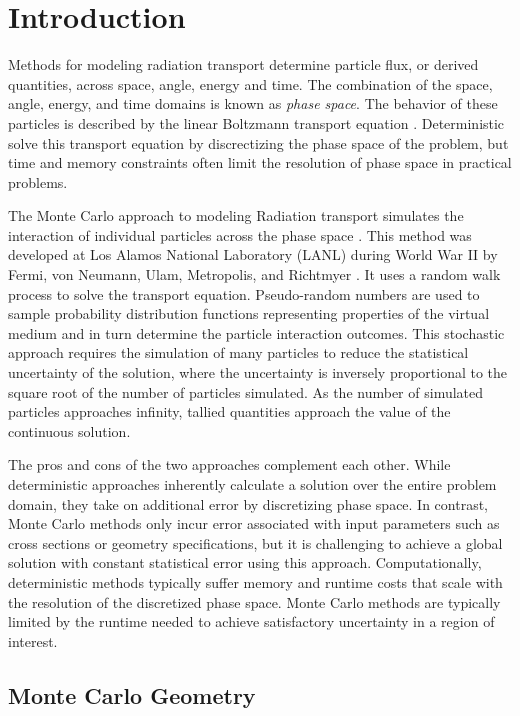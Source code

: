
\chapter{Introduction}\label{ch:introduction}

Methods for modeling radiation transport determine particle flux, or derived
quantities, across space, angle, energy and time. The combination of the space,
angle, energy, and time domains is known as \textit{phase space}. The behavior
of these particles is described by the linear Boltzmann transport
equation \cite{Ulam_1949}. Deterministic solve this transport equation by discrectizing
the phase space of the problem, but time and memory constraints often limit the
resolution of phase space in practical problems.

The Monte Carlo approach to modeling Radiation transport simulates the
interaction of individual particles across the phase
space \cite{Lewis_1993}. This method was developed at Los Alamos National
Laboratory (LANL) during World War II by Fermi, von Neumann, Ulam, Metropolis,
and Richtmyer \cite{LANL_1987}. It uses a random walk process to solve the
transport equation. Pseudo-random numbers are used to sample probability
distribution functions representing properties of the virtual medium and in turn
determine the particle interaction outcomes. This stochastic approach requires
the simulation of many particles to reduce the statistical uncertainty of the
solution, where the uncertainty is inversely proportional to the square root of
the number of particles simulated. As the number of simulated particles
approaches infinity, tallied quantities approach the value of the continuous
solution.

The pros and cons of the two approaches complement each other. While
deterministic approaches inherently calculate a solution over the entire problem
domain, they take on additional error by discretizing phase space. In contrast,
Monte Carlo methods only incur error associated with input parameters such as
cross sections or geometry specifications, but it is challenging to achieve a
global solution with constant statistical error using this
approach. Computationally, deterministic methods typically suffer memory and
runtime costs that scale with the resolution of the discretized phase
space. Monte Carlo methods are typically limited by the runtime needed to
achieve satisfactory uncertainty in a region of interest.


\section{Monte Carlo Geometry}


